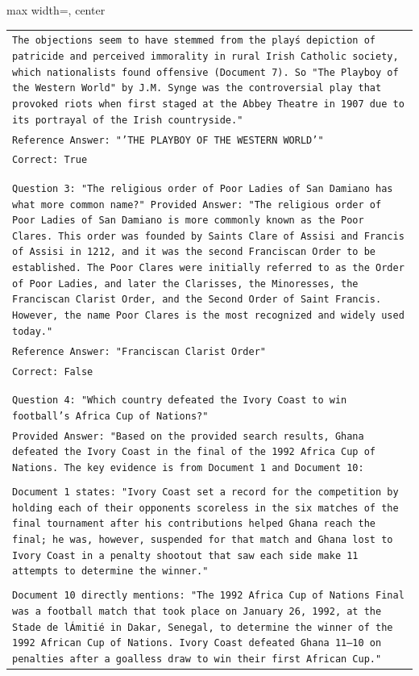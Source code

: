 \documentclass[11pt]{article}
\begin{document}
\begin{table}[ht]
\begin{adjustbox}{max width=\textwidth, center}
\begin{tabular}{>{\raggedright\arraybackslash\tt}p{}<{}}
\\
The objections seem to have stemmed from the play\'s depiction of patricide and perceived immorality in rural Irish Catholic society, which nationalists found offensive (Document 7). So "The Playboy of the Western World" by J.M. Synge was the controversial play that provoked riots when first staged at the Abbey Theatre in 1907 due to its portrayal of the Irish countryside."\\
Reference Answer: "'THE PLAYBOY OF THE WESTERN WORLD'"\\
Correct: True\\
\\
\\
Question 3: "The religious order of Poor Ladies of San Damiano has what more common name?"
Provided Answer: "The religious order of Poor Ladies of San Damiano is more commonly known as the Poor Clares. This order was founded by Saints Clare of Assisi and Francis of Assisi in 1212, and it was the second Franciscan Order to be established. The Poor Clares were initially referred to as the Order of Poor Ladies, and later the Clarisses, the Minoresses, the Franciscan Clarist Order, and the Second Order of Saint Francis. However, the name Poor Clares is the most recognized and widely used today."\\
Reference Answer: "Franciscan Clarist Order"\\
Correct: False\\
\\
\\
Question 4: "Which country defeated the Ivory Coast to win football's Africa Cup of Nations?"\\
Provided Answer: "Based on the provided search results, Ghana defeated the Ivory Coast in the final of the 1992 Africa Cup of Nations. The key evidence is from Document 1 and Document 10:\\
\\
Document 1 states: "Ivory Coast set a record for the competition by holding each of their opponents scoreless in the six matches of the final tournament after his contributions helped Ghana reach the final; he was, however, suspended for that match and Ghana lost to Ivory Coast in a penalty shootout that saw each side make 11 attempts to determine the winner."\\
\\
Document 10 directly mentions: "The 1992 Africa Cup of Nations Final was a football match that took place on January 26, 1992, at the Stade de l\'Amitié in Dakar, Senegal, to determine the winner of the 1992 African Cup of Nations. Ivory Coast defeated Ghana 11–10 on penalties after a goalless draw to win their first African Cup."\\

\end{tabular}
\end{adjustbox}
\end{table}
\end{document}
